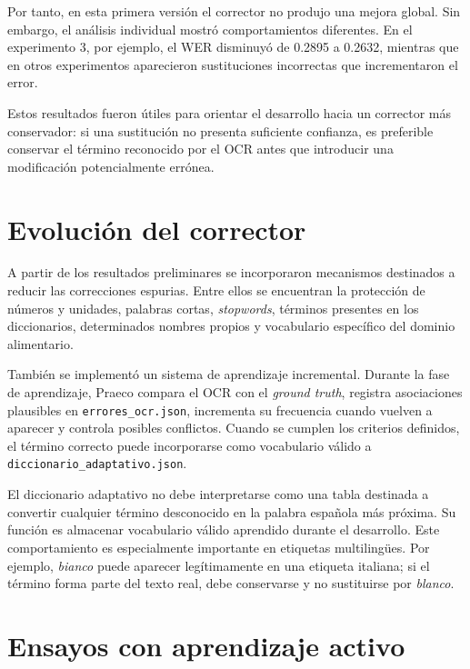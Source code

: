 Por tanto, en esta primera versión el corrector no produjo una mejora global. Sin embargo, el análisis individual mostró comportamientos diferentes. En el experimento 3, por ejemplo, el WER disminuyó de 0.2895 a 0.2632, mientras que en otros experimentos aparecieron sustituciones incorrectas que incrementaron el error.

Estos resultados fueron útiles para orientar el desarrollo hacia un corrector más conservador: si una sustitución no presenta suficiente confianza, es preferible conservar el término reconocido por el OCR antes que introducir una modificación potencialmente errónea.

\section{Evolución del corrector}

A partir de los resultados preliminares se incorporaron mecanismos destinados a reducir las correcciones espurias. Entre ellos se encuentran la protección de números y unidades, palabras cortas, \textit{stopwords}, términos presentes en los diccionarios, determinados nombres propios y vocabulario específico del dominio alimentario.

También se implementó un sistema de aprendizaje incremental. Durante la fase de aprendizaje, Praeco compara el OCR con el \textit{ground truth}, registra asociaciones plausibles en \texttt{errores\_ocr.json}, incrementa su frecuencia cuando vuelven a aparecer y controla posibles conflictos. Cuando se cumplen los criterios definidos, el término correcto puede incorporarse como vocabulario válido a \texttt{diccionario\_adaptativo.json}.

El diccionario adaptativo no debe interpretarse como una tabla destinada a convertir cualquier término desconocido en la palabra española más próxima. Su función es almacenar vocabulario válido aprendido durante el desarrollo. Este comportamiento es especialmente importante en etiquetas multilingües. Por ejemplo, \textit{bianco} puede aparecer legítimamente en una etiqueta italiana; si el término forma parte del texto real, debe conservarse y no sustituirse por \textit{blanco}.

\section{Ensayos con aprendizaje activo}

